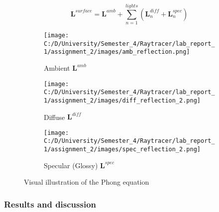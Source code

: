 \documentclass{article}
\begin{document}
	\begin{equation}
		\pmb{L}^{surface}= \pmb{L}^{amb} + \sum_{n=1}^{lights} (\pmb{L}_n^{diff} + \pmb{L}_n^{spec})
	\end{equation}
	
	
	\begin{figure}[ht]
		\begin{center}
			\begin{subfigure}{.3\textwidth}
				\centering
				\texttt{[image: C:/D/University/Semester\_4/Raytracer/lab\_report\_1/assignment\_2/images/amb\_reflection.png]}  
				\caption{Ambient $ \pmb{L}^{amb} $}
				\label{fig:sub-first}
			\end{subfigure}
			\begin{subfigure}{.3\textwidth}
				\centering
				\texttt{[image: C:/D/University/Semester\_4/Raytracer/lab\_report\_1/assignment\_2/images/diff\_reflection\_2.png]}  
				\caption{Diffuse $ \pmb{L}^{diff} $}
				\label{fig:sub-second}
			\end{subfigure}
			\begin{subfigure}{.3\textwidth}
				\centering
				\texttt{[image: C:/D/University/Semester\_4/Raytracer/lab\_report\_1/assignment\_2/images/spec\_reflection\_2.png]}  
				\caption{ Specular (Glossy)  $ \pmb{L}^{spec} $}
				\label{fig:sub-third}
			\end{subfigure}
			
			\caption{Visual illustration of the Phong equation}
			\label{fig:6}
		\end{center}
	\end{figure}
	
	\subsubsection{Results and discussion}
	
\end{document}
